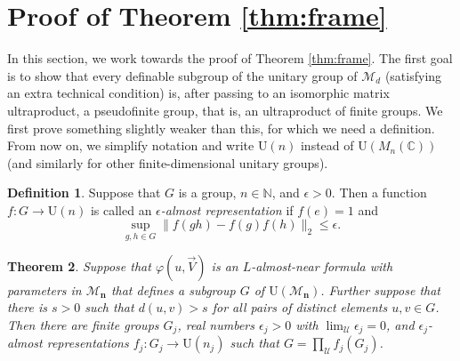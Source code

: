 \documentclass[12pt]{amsart}
\numberwithin{equation}{section}
\newtheorem{thm}{Theorem}[section]
\theoremstyle{definition}
\newtheorem{defn}[thm]{Definition}
\newcommand{\N}{\mathbb{N}}
\def\bb{\mathbb}
\def\cal{\mathcal}
\def\M{\mathcal{M}}
\newcommand\cU{{\cal U}}
\def \M{\mathcal{M}}
\begin{document}
\section{Proof of Theorem \ref{thm:frame}}\label{sec:frame}

In this section, we work towards the proof of Theorem \ref{thm:frame}.  The first goal is to show that every definable subgroup of the unitary group of $\M_d$ (satisfying an extra technical condition) is, after passing to an isomorphic matrix ultraproduct, a pseudofinite group, that is, an ultraproduct of finite groups.  We first prove something slightly weaker than this, for which we need a definition.  From now on, we simplify notation and write $\mathrm{U}(n)$ instead of $\mathrm{U}(M_n(\bb C))$ (and similarly for other finite-dimensional unitary groups).

\begin{defn}
Suppose that $G$ is a group, $n\in \N$, and $\epsilon>0$.  Then a function $f:G\to \mathrm{U}(n)$ is called an \emph{$\epsilon$-almost representation} if $f(e)=1$ and $$\sup_{g,h\in G}\|f(gh)-f(g)f(h)\|_2\leq \epsilon.$$
\end{defn}

\begin{thm}\label{thm:pseudofinite}
Suppose that $\varphi(u,\vec V)$ is an $L$-almost-near formula with parameters in $\M_{\mathbf{n}}$ that defines a subgroup $G$ of $\mathrm{U}(\M_{\mathbf{n}})$.  Further suppose that there is $s>0$ such that $d(u,v)>s$ for all pairs of distinct elements $u,v\in G$.  Then there are finite groups $G_j$, real numbers $\epsilon_j>0$ with $\lim_\cU \epsilon_j=0$, and $\epsilon_j$-almost representations $f_j:G_j\to \mathrm{U}(n_j)$ such that $G=\prod_\cU f_j(G_j)$. 
\end{thm}
\end{document}
